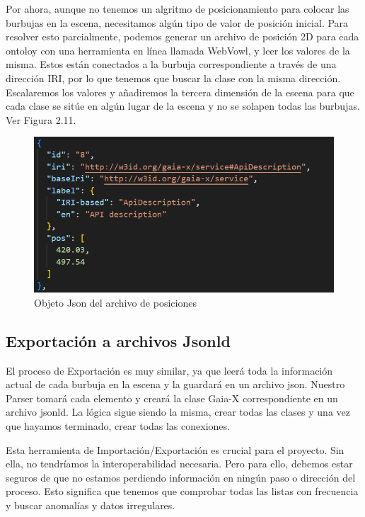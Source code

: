 Por ahora, aunque no tenemos un algritmo de posicionamiento para colocar las burbujas en la escena, necesitamos algún tipo de valor de posición inicial. Para resolver esto parcialmente, podemos generar un archivo de posición 2D para cada ontoloy con una herramienta en línea llamada WebVowl, y leer los valores de la misma. Estos están conectados a la burbuja correspondiente a través de una dirección IRI, por lo que tenemos que buscar la clase con la misma dirección. Escalaremos los valores y añadiremos la tercera dimensión de la escena para que cada clase se sitúe en algún lugar de la escena y no se solapen todas las burbujas. Ver Figura 2.11.
\begin{figure}[ht]
   \begin{center}
      \includegraphics[width=0.7\linewidth]{chapter2/figures/position.png}
   \end{center}
   \caption[Objeto Json del archivo de posiciones]
   {\footnotesize Objeto Json del archivo de posiciones}
   \label{fig:mufigure13}
\end{figure}

\subsection{Exportación a archivos Jsonld}

El proceso de Exportación es muy similar, ya que leerá toda la información actual de cada burbuja en la escena y la guardará en un archivo json. Nuestro Parser tomará cada elemento y creará la clase Gaia-X correspondiente en un archivo jsonld. La lógica sigue siendo la misma, crear todas las clases y una vez que hayamos terminado, crear todas las conexiones.

Esta herramienta de Importación/Exportación es crucial para el proyecto. Sin ella, no tendríamos la interoperabilidad necesaria. Pero para ello, debemos estar seguros de que no estamos perdiendo información en ningún paso o dirección del proceso. Esto significa que tenemos que comprobar todas las listas con frecuencia y buscar anomalías y datos irregulares.

